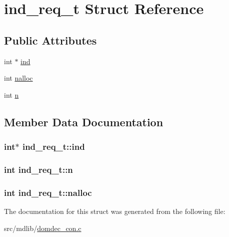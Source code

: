 \hypertarget{structind__req__t}{\section{ind\-\_\-req\-\_\-t \-Struct \-Reference}
\label{structind__req__t}
}
\subsection*{\-Public \-Attributes}
\begin{DoxyCompactItemize}
\item 
int $\ast$ \hyperlink{structind__req__t_aa41f97e08352b8568985633a7198205a}{ind}
\item 
int \hyperlink{structind__req__t_a0c7843617895d0d549b147746a900565}{nalloc}
\item 
int \hyperlink{structind__req__t_afa5f9e78e04d45175df4d3eb09ff4c38}{n}
\end{DoxyCompactItemize}


\subsection{\-Member \-Data \-Documentation}
\hypertarget{structind__req__t_aa41f97e08352b8568985633a7198205a}{
\subsubsection[{ind}]{\setlength{\rightskip}{0pt plus 5cm}int$\ast$ {\bf ind\-\_\-req\-\_\-t\-::ind}}}\label{structind__req__t_aa41f97e08352b8568985633a7198205a}
\hypertarget{structind__req__t_afa5f9e78e04d45175df4d3eb09ff4c38}{
\subsubsection[{n}]{\setlength{\rightskip}{0pt plus 5cm}int {\bf ind\-\_\-req\-\_\-t\-::n}}}\label{structind__req__t_afa5f9e78e04d45175df4d3eb09ff4c38}
\hypertarget{structind__req__t_a0c7843617895d0d549b147746a900565}{
\subsubsection[{nalloc}]{\setlength{\rightskip}{0pt plus 5cm}int {\bf ind\-\_\-req\-\_\-t\-::nalloc}}}\label{structind__req__t_a0c7843617895d0d549b147746a900565}


\-The documentation for this struct was generated from the following file\-:\begin{DoxyCompactItemize}
\item 
src/mdlib/\hyperlink{domdec__con_8c}{domdec\-\_\-con.\-c}\end{DoxyCompactItemize}
